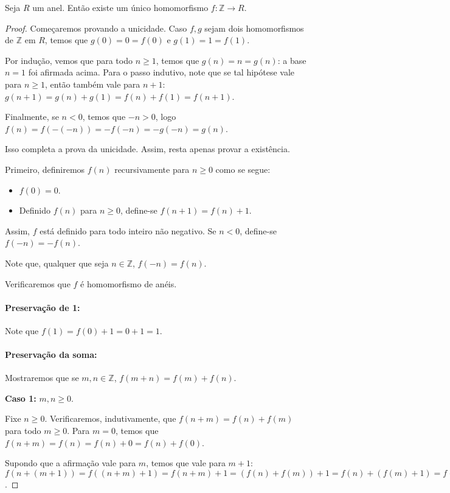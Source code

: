 \begin{prop}
Seja $R$ um anel.
Então existe um único homomorfismo $f:\mathbb Z\rightarrow R$.
\end{prop}

\begin{proof}
Começaremos provando a unicidade.
Caso $f, g$ sejam dois homomorfismos de $\mathbb Z$ em $R$, temos que $g(0)=0=f(0)$ e $g(1)=1=f(1)$.

Por indução, vemos que para todo $n\geq 1$, temos que $g(n)=n=g(n)$: a base $n=1$ foi afirmada acima.
Para o passo indutivo, note que se tal hipótese vale para $n\geq 1$, então também vale para $n+1$: $g(n+1)=g(n)+g(1)=f(n)+f(1)=f(n+1)$.

Finalmente, se $n<0$, temos que $-n>0$, logo $f(n)=f(-(-n))=-f(-n)=-g(-n)=g(n)$.

Isso completa a prova da unicidade.
Assim, resta apenas provar a existência.

Primeiro, definiremos $f(n)$ recursivamente para $n\geq 0$ como se segue:

\begin{itemize}
    \item $f(0)=0$.
    \item Definido $f(n)$ para $n\geq 0$, define-se $f(n+1)=f(n)+1$.
\end{itemize}
Assim, $f$ está definido para todo inteiro não negativo. Se $n<0$, define-se $f(-n)=-f(n)$.

Note que, qualquer que seja $n \in \mathbb Z$, $f(-n)=f(n)$.

Verificaremos que $f$ é homomorfismo de anéis.

\paragraph{Preservação de 1:} Note que $f(1)=f(0)+1=0+1=1$.

\paragraph{Preservação da soma:}
Mostraremos que se $m, n \in \mathbb Z$, $f(m+n)=f(m)+f(n)$.

\textbf{Caso 1:} $m, n\geq 0$.

Fixe $n\geq 0$.
Verificaremos, indutivamente, que $f(n+m)=f(n)+f(m)$ para todo $m\geq 0$.
Para $m=0$, temos que $f(n+m)=f(n)=f(n)+0=f(n)+f(0)$.

Supondo que a afirmação vale para $m$, temos que vale para $m+1$:
$f(n+(m+1))=f((n+m)+1)=f(n+m)+1=(f(n)+f(m))+1=f(n)+(f(m)+1)=f(n)+f(m+1)$.


\end{proof}
